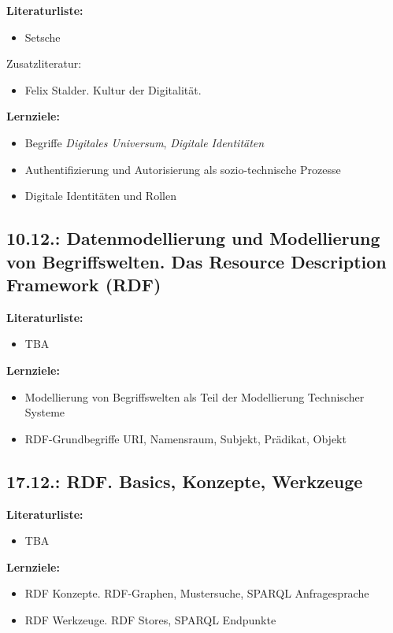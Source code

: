 \documentclass[11pt,a4paper]{article}
\begin{document}
\textbf{Literaturliste:}
\begin{itemize}[noitemsep]
\item Setsche
\end{itemize}

Zusatzliteratur:
\begin{itemize}[noitemsep]
\item Felix Stalder. Kultur der Digitalität.
\end{itemize}

\textbf{Lernziele:}
\begin{itemize}[noitemsep]
\item Begriffe \emph{Digitales Universum}, \emph{Digitale Identitäten}
\item Authentifizierung und Autorisierung als sozio-technische Prozesse
\item Digitale Identitäten und Rollen
\end{itemize}

\subsection{10.12.: Datenmodellierung und Modellierung von Begriffswelten.
  Das Resource Description Framework (RDF)}

\textbf{Literaturliste:}
\begin{itemize}[noitemsep]
\item TBA
\end{itemize}

\textbf{Lernziele:}
\begin{itemize}[noitemsep]
\item Modellierung von Begriffswelten als Teil der Modellierung Technischer Systeme
\item RDF-Grundbegriffe URI, Namensraum, Subjekt, Prädikat, Objekt
\end{itemize}

\subsection{17.12.: RDF. Basics, Konzepte, Werkzeuge}

\textbf{Literaturliste:}
\begin{itemize}
\item TBA
\end{itemize}

\textbf{Lernziele:}
\begin{itemize}[noitemsep]
\item RDF Konzepte. RDF-Graphen, Mustersuche, SPARQL Anfragesprache
\item RDF Werkzeuge. RDF Stores, SPARQL Endpunkte
\end{itemize}
\end{document}
